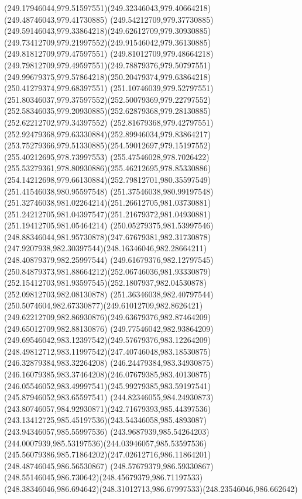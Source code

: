 {{	\curveto(249.17946044,979.51597551)(249.32346043,979.40664218)(249.48746043,979.41730885)
	\curveto(249.54212709,979.37730885)(249.59146043,979.33864218)(249.62612709,979.30930885)
	\curveto(249.73412709,979.21997552)(249.91546042,979.36130885)(249.81812709,979.47597551)
	\curveto(249.81012709,979.48664218)(249.79812709,979.49597551)(249.78879376,979.50797551)
	\curveto(249.99679375,979.57864218)(250.20479374,979.63864218)(250.41279374,979.68397551)
	\curveto(251.10746039,979.52797551)(251.80346037,979.37597552)(252.50079369,979.22797552)
	\curveto(252.58346035,979.20930885)(252.62879368,979.28130885)(252.62212702,979.34397552)
	\curveto(252.81679368,979.42797551)(252.92479368,979.63330884)(252.89946034,979.83864217)
	\curveto(253.75279366,979.51330885)(254.59012697,979.15197552)(255.40212695,978.73997553)
	\curveto(255.47546028,978.7026422)(255.53279361,978.80930886)(255.46212695,978.85330886)
	\curveto(254.14212698,979.66130884)(252.79812701,980.35597549)(251.41546038,980.95597548)
	\curveto(251.37546038,980.99197548)(251.32746038,981.02264214)(251.26612705,981.03730881)
	\curveto(251.24212705,981.04397547)(251.21679372,981.04930881)(251.19412705,981.05464214)
	\curveto(250.05279375,981.53997546)(248.88346044,981.95730878)(247.67679381,982.31730878)
	\curveto(247.9207938,982.30397544)(248.16346046,982.28664211)(248.40879379,982.25997544)
	\curveto(249.61679376,982.12797545)(250.84879373,981.88664212)(252.06746036,981.93330879)
	\curveto(252.15412703,981.93597545)(252.1807937,982.04530878)(252.09812703,982.08130878)
	\curveto(251.36346038,982.40797544)(250.5074604,982.67330877)(249.61012709,982.8626421)
	\curveto(249.62212709,982.86930876)(249.63679376,982.87464209)(249.65012709,982.88130876)
	\curveto(249.77546042,982.93864209)(249.69546042,983.12397542)(249.57679376,983.12264209)
	\curveto(248.49812712,983.11997542)(247.40746048,983.18530875)(246.32879384,983.32264208)
	\curveto(246.24479384,983.34930875)(246.16079385,983.37464208)(246.07679385,983.40130875)
	\curveto(246.05546052,983.49997541)(245.99279385,983.59197541)(245.87946052,983.65597541)
	\curveto(244.82346055,984.24930873)(243.80746057,984.92930871)(242.71679393,985.44397536)
	\curveto(243.13412725,985.45197536)(243.54346058,985.4893087)(243.94346057,985.55997536)
	\curveto(243.9687939,985.54264203)(244.0007939,985.53197536)(244.03946057,985.53597536)
	\curveto(245.56079386,985.71864202)(247.02612716,986.11864201)(248.48746045,986.56530867)
	\curveto(248.57679379,986.59330867)(248.55146045,986.730642)(248.45679379,986.71197533)
	\curveto(248.38346046,986.694642)(248.31012713,986.67997533)(248.23546046,986.662642)
}}
